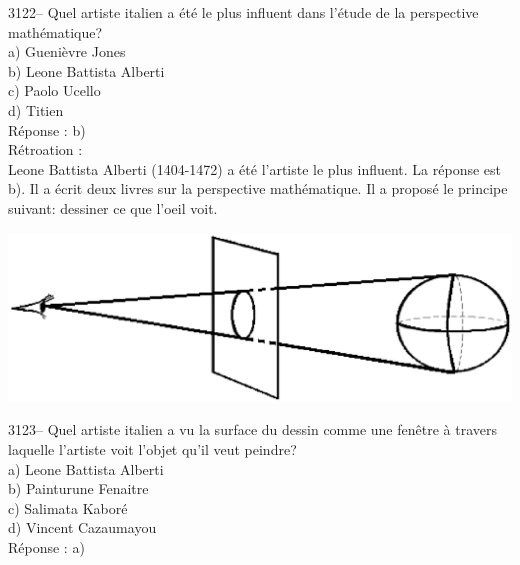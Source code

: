\documentclass[letterpaper, 12pt]{article}
\begin{document}
3122-- Quel artiste italien a \'et\'e le plus influent dans l'\'etude de la perspective math\'ematique?\\

a) Gueni\`evre Jones\\
b) Leone Battista Alberti\\
c) Paolo Ucello\\
d) Titien\\

R\'eponse : b)\\

R\'etroation :\\
Leone Battista Alberti (1404-1472) a \'et\'e l'artiste le plus influent. La r\'eponse est b). Il a \'ecrit deux livres sur la perspective math\'ematique. Il a propos\'e le principe suivant: \og dessiner ce que l'oeil voit\fg.
\begin{center}
\includegraphics[scale=0.6]{perspective.eps}\\
\end{center}



3123-- Quel artiste italien a vu la surface du dessin comme une fen\^etre \`a travers laquelle l'artiste voit l'objet qu'il veut peindre?\\

a) Leone Battista Alberti\\
b) Painturune Fenaitre\\
c) Salimata Kabor\'e\\
d) Vincent Cazaumayou\\

R\'eponse : a)\\
\end{document}
